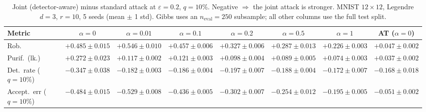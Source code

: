 \begin{table}[htbp]
  \centering
  \begin{tabular}{@{}lccccccc@{}}
    \toprule
    Metric & $\alpha{=}0$ & $\alpha{=}0.01$ & $\alpha{=}0.1$ & $\alpha{=}0.2$ & $\alpha{=}0.5$ & $\alpha{=}1$ & AT ($\alpha{=}0$) \\
    \midrule
    Rob. & $+0.485 \pm 0.015$ & $+0.546 \pm 0.010$ & $+0.457 \pm 0.006$ & $+0.327 \pm 0.006$ & $+0.287 \pm 0.013$ & $+0.226 \pm 0.003$ & $+0.047 \pm 0.002$ \\
    Purif.\ (lk.) & $+0.272 \pm 0.023$ & $+0.117 \pm 0.002$ & $+0.121 \pm 0.003$ & $+0.098 \pm 0.004$ & $+0.089 \pm 0.005$ & $+0.074 \pm 0.003$ & $+0.037 \pm 0.002$ \\
    Det.\ rate ($q{=}10\%$) & $-0.347 \pm 0.038$ & $-0.182 \pm 0.003$ & $-0.186 \pm 0.004$ & $-0.197 \pm 0.007$ & $-0.188 \pm 0.004$ & $-0.172 \pm 0.007$ & $-0.168 \pm 0.018$ \\
    Accept.\ err ($q{=}10\%$) & $-0.484 \pm 0.015$ & $-0.529 \pm 0.008$ & $-0.436 \pm 0.005$ & $-0.302 \pm 0.007$ & $-0.254 \pm 0.012$ & $-0.195 \pm 0.005$ & $-0.051 \pm 0.002$ \\
    \bottomrule
  \end{tabular}
  \caption{Joint (detector-aware) minus standard attack at $\varepsilon=0.2$, $q{=}10\%$. Negative $\Rightarrow$ the joint attack is stronger. MNIST $12\times12$, Legendre $d{=}3$, $r{=}10$, 5 seeds (mean $\pm$ 1 std). Gibbs uses an $n_{\mathrm{eval}}=250$ subsample; all other columns use the full test split.}
  \label{tab:mnist_r12_joint_r10_eps0.2}
\end{table}
